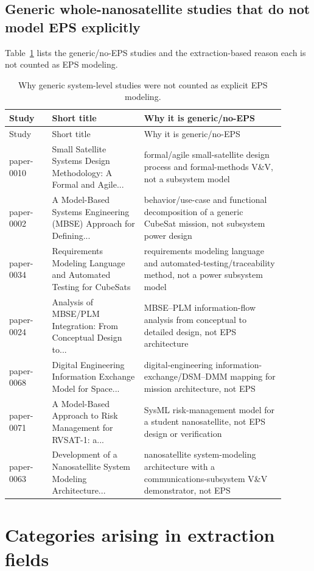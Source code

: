 \documentclass[11pt]{article}
\begin{document}
\subsection{Generic whole-nanosatellite studies that do not model EPS explicitly}
Table~\ref{tab:generic-no-eps} lists the generic/no-EPS studies and the extraction-based reason each is not counted as EPS modeling.
\begin{longtable}{p{0.14\linewidth}p{0.30\linewidth}p{0.46\linewidth}}
\caption{Why generic system-level studies were not counted as explicit EPS modeling.}\label{tab:generic-no-eps}\\
\toprule Study & Short title & Why it is generic/no-EPS \\
\midrule\endfirsthead
\toprule Study & Short title & Why it is generic/no-EPS \\ \midrule\endhead
paper-0010 & Small Satellite Systems Design Methodology: A Formal and Agile... & formal/agile small-satellite design process and formal-methods V\&V, not a subsystem model \\
paper-0002 & A Model-Based Systems Engineering (MBSE) Approach for Defining... & behavior/use-case and functional decomposition of a generic CubeSat mission, not subsystem power design \\
paper-0034 & Requirements Modeling Language and Automated Testing for CubeSats & requirements modeling language and automated-testing/traceability method, not a power subsystem model \\
paper-0024 & Analysis of MBSE/PLM Integration: From Conceptual Design to... & MBSE--PLM information-flow analysis from conceptual to detailed design, not EPS architecture \\
paper-0068 & Digital Engineering Information Exchange Model for Space... & digital-engineering information-exchange/DSM--DMM mapping for mission architecture, not EPS \\
paper-0071 & A Model-Based Approach to Risk Management for RVSAT-1: a... & SysML risk-management model for a student nanosatellite, not EPS design or verification \\
paper-0063 & Development of a Nanosatellite System Modeling Architecture... & nanosatellite system-modeling architecture with a communications-subsystem V\&V demonstrator, not EPS \\
\bottomrule\end{longtable}

\section{Categories arising in extraction fields}
\end{document}
